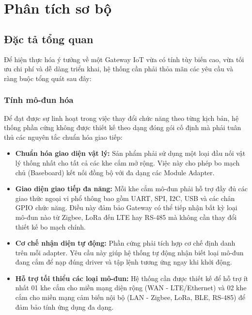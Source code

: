 \section{Phân tích sơ bộ}\label{sec:phan_tich_so_bo}
    \subsection{Đặc tả tổng quan}\label{sec:dac_ta_tong_quan}
        Để hiện thực hóa ý tưởng về một Gateway IoT vừa có tính tùy biến cao, vừa tối ưu chi phí và dễ dàng triển khai, hệ thống cần phải thỏa mãn các yêu cầu và ràng buộc tổng quát sau đây:

        \subsubsection{Tính mô-đun hóa}
            Để đạt được sự linh hoạt trong việc thay đổi chức năng theo từng kịch bản, hệ thống phần cứng không được thiết kế theo dạng đóng gói cố định mà phải tuân thủ các nguyên tắc chuẩn hóa giao tiếp:
            \begin{itemize}
                \item \textbf{Chuẩn hóa giao diện vật lý:} Sản phẩm phải sử dụng một loại đầu nối vật lý thống nhất cho tất cả các khe cắm mở rộng. Việc này cho phép bo mạch chủ (Baseboard) kết nối đồng bộ với đa dạng các Module Adapter.
                \item \textbf{Giao diện giao tiếp đa năng:} Mỗi khe cắm mô-đun phải hỗ trợ đầy đủ các giao thức ngoại vi phổ thông bao gồm UART, SPI, I2C, USB và các chân GPIO chức năng. Điều này đảm bảo Gateway có thể tiếp nhận bất kỳ loại mô-đun nào từ Zigbee, LoRa đến LTE hay RS-485 mà không cần thay đổi thiết kế bo mạch chính.
                \item \textbf{Cơ chế nhận diện tự động:} Phần cứng phải tích hợp cơ chế định danh trên mỗi adapter. Yêu cầu này giúp hệ thống tự động nhận biết loại mô-đun đang cắm để nạp đúng driver và tập lệnh tương ứng ngay khi khởi động.
                \item \textbf{Hỗ trợ tối thiểu các loại mô-đun:} Hệ thống cần được thiết kế để hỗ trợ ít nhất 01 khe cắm cho miền mạng diện rộng (WAN - LTE/Ethernet) và 02 khe cắm cho miền mạng cảm biến nội bộ (LAN - Zigbee, LoRa, BLE, RS-485) để đảm bảo tính ứng dụng đa dạng.
            \end{itemize}
    
